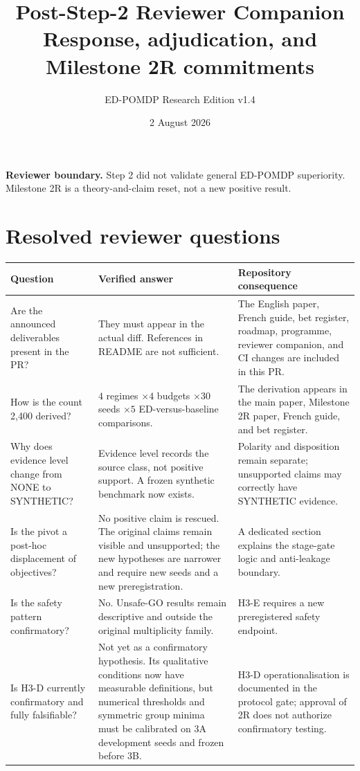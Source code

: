 \documentclass[11pt,a4paper]{article}
\title{\textbf{Post-Step-2 Reviewer Companion}\\Response, adjudication, and Milestone 2R commitments}
\author{ED-POMDP Research Edition v1.4}
\date{2 August 2026}
\begin{document}
\maketitle

\begin{tcolorbox}[colback=softblue,colframe=deepblue,boxrule=0.8pt,arc=2mm]
\textbf{Reviewer boundary.} Step 2 did not validate general ED-POMDP superiority. Milestone 2R is a theory-and-claim reset, not a new positive result.
\end{tcolorbox}

\section*{Resolved reviewer questions}

\begin{longtable}{p{}p{}p{}}
\toprule
Question & Verified answer & Repository consequence \\
\midrule
Are the announced deliverables present in the PR? & They must appear in the actual diff. References in README are not sufficient. & The English paper, French guide, bet register, roadmap, programme, reviewer companion, and CI changes are included in this PR. \\
How is the count 2,400 derived? & $4$ regimes $\times 4$ budgets $\times 30$ seeds $\times 5$ ED-versus-baseline comparisons. & The derivation appears in the main paper, Milestone 2R paper, French guide, and bet register. \\
Why does evidence level change from NONE to SYNTHETIC? & Evidence level records the source class, not positive support. A frozen synthetic benchmark now exists. & Polarity and disposition remain separate; unsupported claims may correctly have SYNTHETIC evidence. \\
Is the pivot a post-hoc displacement of objectives? & No positive claim is rescued. The original claims remain visible and unsupported; the new hypotheses are narrower and require new seeds and a new preregistration. & A dedicated section explains the stage-gate logic and anti-leakage boundary. \\
Is the safety pattern confirmatory? & No. Unsafe-GO results remain descriptive and outside the original multiplicity family. & H3-E requires a new preregistered safety endpoint. \\
Is H3-D currently confirmatory and fully falsifiable? & Not yet as a confirmatory hypothesis. Its qualitative conditions now have measurable definitions, but numerical thresholds and symmetric group minima must be calibrated on 3A development seeds and frozen before 3B. & H3-D operationalisation is documented in the protocol gate; approval of 2R does not authorize confirmatory testing. \\
\bottomrule
\end{longtable}
\end{document}
